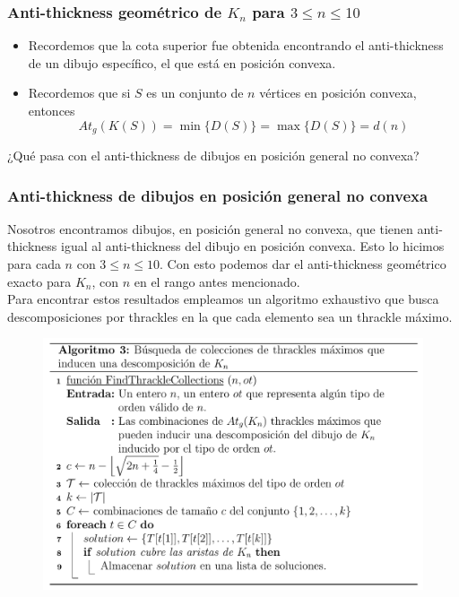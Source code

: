 \begin{frame}
\frametitle{Anti-thickness geométrico de $K_n$ para $3\leq n\leq 10$}
\begin{itemize}
	\item[] Recordemos que la cota superior fue obtenida encontrando el anti-thickness de un dibujo específico, el que está en posición convexa.
	\item[] Recordemos que si $S$ es un conjunto de $n$ vértices en posición convexa, entonces \[ At_g(K(S)) = \min\{D(S)\} = \max\{D(S)\} = d(n)\]
\end{itemize}
¿Qué pasa con el anti-thickness de dibujos en posición general no convexa?
\end{frame}

\begin{frame}
\frametitle{Anti-thickness de dibujos en posición general no convexa}
Nosotros encontramos dibujos, en posición general no convexa, que tienen anti-thickness igual al anti-thickness del dibujo en posición convexa. Esto lo hicimos para cada $n$ con $3\leq n \leq 10$. Con esto podemos dar el anti-thickness geométrico exacto para $K_n$, con $n$ en el rango antes mencionado. \\[15pt]

Para encontrar estos resultados empleamos un algoritmo exhaustivo que busca descomposiciones por thrackles en la que cada elemento sea un thrackle máximo.
\end{frame}
\begin{frame}
\begin{figure}
	\centering
	\includegraphics[width=1\linewidth]{images/algo_codigo}
\end{figure}
\end{frame}

